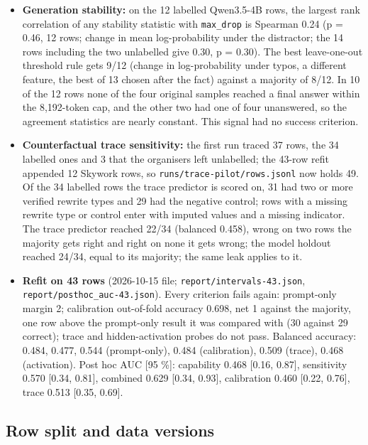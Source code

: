 \documentclass{article}
\begin{document}
\begin{itemize}
  Every interval includes 0.5. The pooled cut mixes scores from different folds, so it is
  descriptive only; the always-``robust'' majority gets 24/34.
\item
  \textbf{Generation stability:} on the 12 labelled Qwen3.5-4B rows, the largest rank correlation of
  any stability statistic with \texttt{max\_drop} is Spearman 0.24 (p = 0.46, 12 rows; change in mean log-probability
  under the distractor; the 14 rows including the two unlabelled give 0.30, p = 0.30). The best leave-one-out threshold rule gets 9/12 (change in log-probability
  under typos, a different feature, the best of 13 chosen after the fact) against a majority of 8/12. In 10 of the 12 rows none of the four original samples
  reached a final answer within the 8,192-token cap, and the other two had one of four unanswered,
  so the agreement statistics are nearly constant. This signal had no success criterion.
\item
  \textbf{Counterfactual trace sensitivity:} the first run traced 37 rows, the 34 labelled ones
  and 3 that the organisers left unlabelled; the 43-row refit appended 12 Skywork rows, so
  \texttt{runs/trace-pilot/rows.jsonl} now holds 49. Of the 34 labelled rows the trace predictor is scored on, 31 had two or
  more verified rewrite types and 29 had the negative control; rows with a missing rewrite type or
  control enter with imputed values and a missing indicator. The trace predictor reached 22/34 (balanced
  0.458), wrong on two rows the majority gets right and right on none it gets wrong; the model
  holdout reached 24/34, equal to its majority; the same leak applies to it.
\item
  \textbf{Refit on 43 rows} (2026-10-15 file; \texttt{report/intervals-43.json}, \texttt{report/posthoc\_auc-43.json}).
  Every criterion fails again: prompt-only margin \textminus{}2; calibration out-of-fold accuracy 0.698, net \textminus{}1 against
  the majority, one row above the prompt-only result it was compared with (30 against 29 correct); trace and hidden-activation probes do not
  pass. Balanced accuracy: 0.484, 0.477, 0.544 (prompt-only), 0.484 (calibration), 0.509 (trace),
  0.468 (activation). Post hoc AUC {[}95 \%{]}: capability 0.468 {[}0.16, 0.87{]}, sensitivity 0.570
  {[}0.34, 0.81{]}, combined 0.629 {[}0.34, 0.93{]}, calibration 0.460 {[}0.22, 0.76{]}, trace 0.513 {[}0.35, 0.69{]}.
\end{itemize}

\subsection{Row split and data versions}\label{sec:B3}
\end{document}
